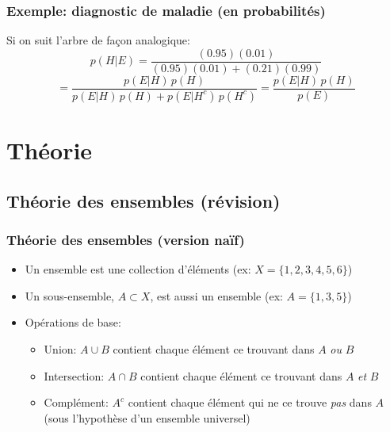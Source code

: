\documentclass{beamer}
\begin{document}
\begin{frame}
    \frametitle{Exemple: diagnostic de maladie (en probabilités)}
    \begin{figure}
      \centering
      \scalebox{0.65}{}
    \end{figure}

    \pause

    Si on suit l'arbre de façon analogique:
    \[p(H | E) = \frac{(0.95)(0.01)}{(0.95)(0.01) + (0.21)(0.99)}\]
    \pause
    \[ = \frac{p(E | H) \, p(H)}{p(E | H) \, p(H) + p(E | H^c) \, p(H^c)} = \frac{p(E | H) \, p(H)}{p(E)}\]
\end{frame}



\section{Théorie}


\subsection{Théorie des ensembles (révision)}

\begin{frame}
  \frametitle{Théorie des ensembles (version naïf)}
  \begin{itemize}
    \item Un ensemble est une collection d'éléments (ex: $X = \{1,2,3,4,5,6\}$)
    \pause
    \item Un sous-ensemble, $A \subset X$, est aussi un ensemble (ex: $A = \{1,3,5\}$)
    \pause
    \item Opérations de base:
    \begin{itemize}
      \item Union: $A \cup B$ contient chaque élément ce trouvant dans $A$ \emph{ou} $B$
      \pause
      \item Intersection: $A \cap B$ contient chaque élément ce trouvant dans $A$ \emph{et} $B$
      \pause
      \item Complément: $A^c$ contient chaque élément qui ne ce trouve \emph{pas} dans $A$ (sous l'hypothèse d'un ensemble universel)
    \end{itemize}
  \end{itemize}
\end{frame}


\end{document}
